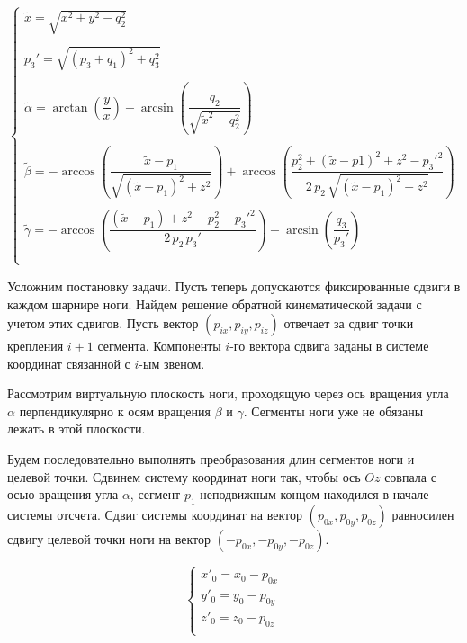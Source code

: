 \begin{equation}
\left\{
\begin{array}{lcr}
\tilde{x} = \sqrt{x^2+y^2-q_2^2}\\
\\
p_3' = \sqrt{(p_3+q_1)^2+q_3^2}\\
\\
\tilde{\alpha} = \arctan(\dfrac{y}{x})-\arcsin(\dfrac{q_2}{\sqrt{\tilde{x}^2-q_2^2}})\\
\\
\tilde{\beta} = -\arccos\left(\dfrac{\tilde{x}-p_1}{\sqrt{(\tilde{x}-p_1)^2+z^2}}\right)+\arccos\left(\dfrac{p_2^2+(\tilde{x}-p1)^2+z^2-p_3'^2}{2\,p_2\,\sqrt{(\tilde{x}-p_1)^2+z^2}}\right)\\
\\
\tilde{\gamma} = -\arccos\left(\dfrac{(\tilde{x}-p_1)+z^2-p_2^2-p_3'^2}{2\,p_2\,p_3'}\right)-\arcsin\left(\dfrac{q_3}{p_3'}\right)\\
\\
\end{array}
\right.
\end{equation}

Усложним постановку задачи. Пусть теперь допускаются фиксированные сдвиги в каждом шарнире ноги. Найдем решение обратной кинематической задачи с учетом этих сдвигов. Пусть вектор $(p_{ix},p_{iy},p_{iz})$ отвечает за сдвиг точки крепления $i+1$ сегмента. Компоненты $i$-го вектора сдвига заданы в системе координат связанной с $i$-ым звеном.


Рассмотрим виртуальную плоскость ноги, проходящую через ось вращения угла $\alpha$ перпендикулярно к осям вращения $\beta$ и $\gamma$. Сегменты ноги уже не обязаны лежать в этой плоскости. 

Будем последовательно выполнять преобразования длин сегментов ноги и целевой точки. Сдвинем систему координат ноги так, чтобы ось $Oz$ совпала с осью вращения угла $\alpha$, сегмент $p_1$ неподвижным концом находился в начале системы отсчета. Сдвиг системы координат на вектор $(p_{0x},p_{0y},p_{0z})$ равносилен сдвигу целевой точки ноги на вектор $(-p_{0x},-p_{0y},-p_{0z})$.

\begin{equation}
\left\{
\begin{array}{lcr}
x'_0 = x_0-p_{0x}\\
y'_0 = y_0-p_{0y}\\
z'_0 = z_0-p_{0z}\\
\end{array}
\right.
\end{equation}

